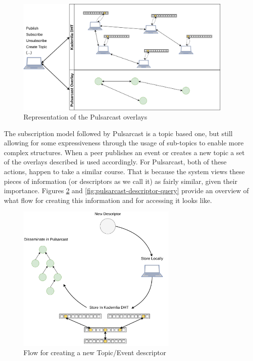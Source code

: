 \begin{figure}[hb!]
  \centering
  \includegraphics[width=0.95\textwidth]{img/pulsarcast-overlays.png}
  \caption{Representation of the Pulsarcast overlays}
  \label{fig:pulsarcast-overlays}
\end{figure}

The subscription model followed by Pulsarcast is a topic based one, but still
allowing for some expressiveness through the usage of sub-topics to enable more
complex structures. When a peer publishes an event or creates a new topic a set
of the overlays described is used accordingly. For Pulsarcast, both of these
actions, happen to take a similar course. That is because the system views these
pieces of information (or descriptors as we call it) as fairly similar, given
their importance. Figures \ref{fig:pulsarcast-descriptor-creation} and
\ref{fig:pulsarcast-descriptor-query} provide an overview of what flow for
creating this information and for accessing it looks like.

\begin{figure}[hb!]
  \centering
  \includegraphics[width=0.7\textwidth]{img/pulsarcast-descriptor-creation.png}
  \caption{Flow for creating a new Topic/Event descriptor}
  \label{fig:pulsarcast-descriptor-creation}
\end{figure}

